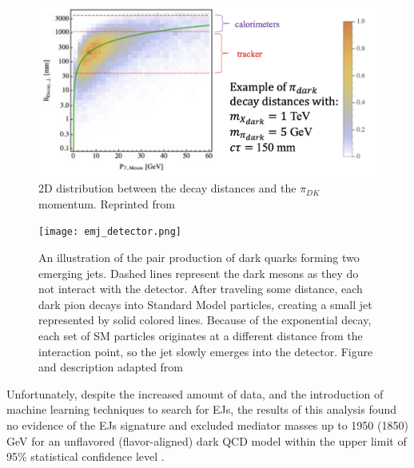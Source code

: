 \begin{figure}
	\centering
	\includegraphics[width=.75\linewidth]{Images/Decay-distances-emj.png}
	\caption[2D distributions of decay distances and $\pi_{DK}$ momentum]{2D distribution between the decay distances and the $\pi_{DK}$ momentum. Reprinted from \cite{Schwaller:2015gea}}
	\label{fig:decay-distance}
\end{figure}



\begin{figure}
	\centering
	\texttt{[image: emj\_detector.png]}
	\caption[Illustration of the emerging jets forming in a detector]{An illustration of the pair production of dark quarks forming two emerging jets. Dashed lines represent the dark mesons as they do not interact with the detector. After traveling some distance, each dark pion decays into Standard Model particles, creating a small jet represented by solid colored lines. Because of the exponential decay, each set of SM particles originates at a different distance from the interaction point, so the jet slowly emerges into the detector. Figure and description adapted from \cite{Schwaller:2015gea}}
	\label{fig:2emj_inCMS}
\end{figure}

Unfortunately, despite the increased amount of data, and the introduction of machine learning techniques to search for EJs, the results of this analysis found no evidence of the EJs signature and excluded mediator masses up to 1950 (1850) GeV for an unflavored (flavor-aligned) dark QCD model within the upper limit of 95\% statistical confidence level \cite{CMS:2024gxp}.

\clearpage

